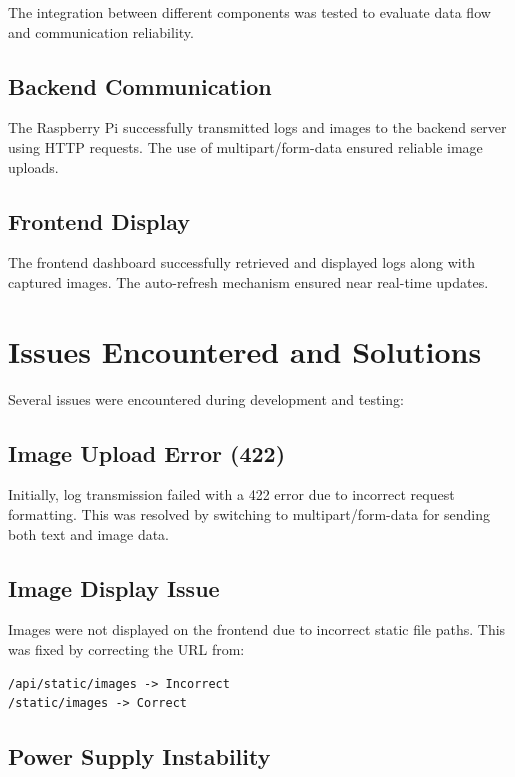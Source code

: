 The integration between different components was tested to evaluate data flow and communication reliability.

\subsection{Backend Communication}

The Raspberry Pi successfully transmitted logs and images to the backend server using HTTP requests. The use of multipart/form-data ensured reliable image uploads.

\subsection{Frontend Display}

The frontend dashboard successfully retrieved and displayed logs along with captured images. The auto-refresh mechanism ensured near real-time updates.

\section{Issues Encountered and Solutions}

Several issues were encountered during development and testing:

\subsection{Image Upload Error (422)}

Initially, log transmission failed with a 422 error due to incorrect request formatting. This was resolved by switching to multipart/form-data for sending both text and image data.

\subsection{Image Display Issue}

Images were not displayed on the frontend due to incorrect static file paths. This was fixed by correcting the URL from:

\begin{verbatim}
/api/static/images -> Incorrect
/static/images -> Correct
\end{verbatim}

\subsection{Power Supply Instability}

